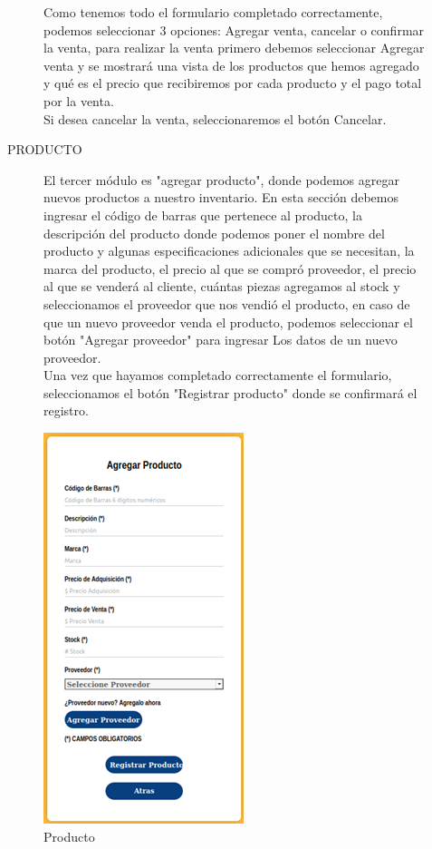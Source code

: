 \documentclass{article}
\begin{document}
\begin{figure}[ht]
\begin{minipage}[t]{0.5\linewidth}
Como tenemos todo el formulario completado correctamente, podemos seleccionar 3 opciones: Agregar venta, cancelar o confirmar la venta, para realizar la venta primero debemos seleccionar Agregar venta y se mostrará una vista de los productos que hemos agregado y qué es el precio que recibiremos por cada producto y el pago total por la venta.\\

Si desea cancelar la venta, seleccionaremos el botón Cancelar. \\
\end{minipage}
\end{figure}

\pagebreak

\begin{center}
PRODUCTO
\end{center}
\begin{figure}[ht]
\begin{minipage}[t]{0.5\linewidth}
\bigskip
\bigskip
\bigskip
\bigskip
El tercer módulo es "agregar producto", donde podemos agregar nuevos productos a nuestro inventario. En esta sección debemos ingresar el código de barras que pertenece al producto, la descripción del producto donde podemos poner el nombre del producto y algunas especificaciones adicionales que se necesitan, la marca del producto, el precio al que se compró proveedor, el precio al que se venderá al cliente, cuántas piezas agregamos al stock y seleccionamos el proveedor que nos vendió el producto, en caso de que un nuevo proveedor venda el producto, podemos seleccionar el botón "Agregar proveedor" para ingresar Los datos de un nuevo proveedor. \\

Una vez que hayamos completado correctamente el formulario, seleccionamos el botón "Registrar producto" donde se confirmará el registro. \\
\end{minipage}
\begin{minipage}[t]{0.5\linewidth}
\caption {Producto}
\centering
\includegraphics[scale=1]{fig7}
\end{minipage}
\end{figure}
\end{document}

